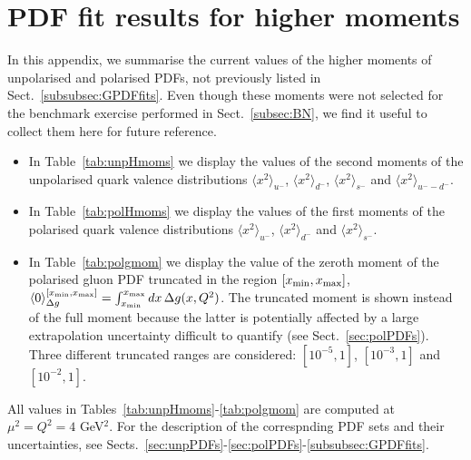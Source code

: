\section{PDF fit results for higher moments }
\label{app:Hmoms}

In this appendix, we summarise the current values of the higher moments of 
unpolarised and polarised PDFs, not previously listed in 
Sect.~\ref{subsubsec:GPDFfits}.
%
Even though these moments were not selected for the benchmark exercise 
performed in Sect.~\ref{subsec:BN}, we find it useful to collect them 
here for future reference.

\begin{itemize}

\item In Table~\ref{tab:unpHmoms} we display the values of the second moments 
of the unpolarised quark valence distributions $\langle x^2\rangle_{u^-}$, 
$\langle x^2\rangle_{d^-}$, $\langle x^2\rangle_{s^-}$ and 
$\langle x^2\rangle_{u^--d^-}$.

\item In Table~\ref{tab:polHmoms} we display the values of the first moments 
of the polarised quark valence distributions $\langle x^2\rangle_{u^-}$, 
$\langle x^2\rangle_{d^-}$ and $\langle x^2\rangle_{s^-}$.

\item In Table~\ref{tab:polgmom} we display the value of the zeroth moment
of the polarised gluon PDF truncated in the region $[x_{\rm min}, x_{\rm max}]$,
$\langle 0\rangle_{\Delta g}^{[x_{\rm min}, x_{\rm max}]}=\int_{x_{\rm min}}^{x_{\rm max}}dx\,\Delta g(x,Q^2)$.
%
The truncated moment is shown instead of the full moment
because the latter is potentially affected by a large extrapolation 
uncertainty difficult to quantify (see Sect.~\ref{sec:polPDFs}). 
%
Three different truncated ranges are considered: $[10^{-5},1]$,  $[10^{-3},1]$
and  $[10^{-2},1]$.

\end{itemize}
%
All values in Tables~\ref{tab:unpHmoms}-\ref{tab:polgmom} are computed at 
$\mu^2=Q^2=4$ GeV$^2$.
%
For the description of the correspnding PDF sets and their uncertainties, see
Sects.~\ref{sec:unpPDFs}-\ref{sec:polPDFs}-\ref{subsubsec:GPDFfits}.

